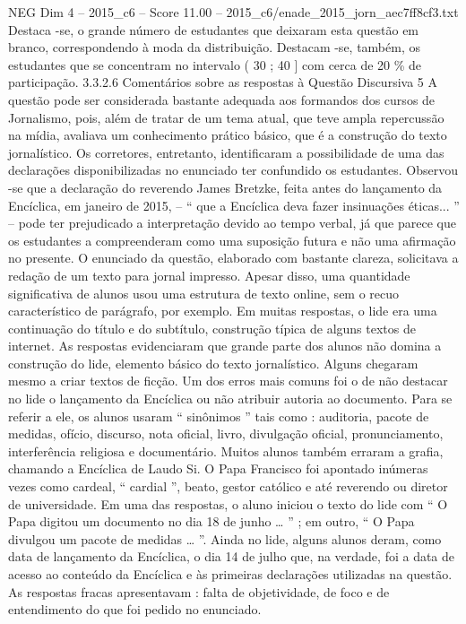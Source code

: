 \begin{textsample}{NEG Dim 4 – 2015\_c6 – Score 11.00 – 2015\_c6/enade\_2015\_jorn\_aec7ff8cf3.txt}
Destaca -se, o grande número de estudantes que deixaram esta questão em branco, correspondendo à moda da distribuição.
Destacam -se, também, os estudantes que se concentram no intervalo ( 30 ; 40 ] com cerca de 20 \% de participação. 3.3.2.6 Comentários sobre as respostas à Questão Discursiva 5 A questão pode ser considerada bastante adequada aos formandos dos cursos de Jornalismo, pois, além de tratar de um tema atual, que teve ampla repercussão na mídia, avaliava um conhecimento prático básico, que é a construção do texto jornalístico.
Os corretores, entretanto, identificaram a possibilidade de uma das declarações disponibilizadas no enunciado ter confundido os estudantes.
Observou -se que a declaração do reverendo James Bretzke, feita antes do lançamento da Encíclica, em janeiro de 2015, – “ que a Encíclica deva fazer insinuações éticas... ” – pode ter prejudicado a interpretação devido ao tempo verbal, já que parece que os estudantes a compreenderam como uma suposição futura e não uma afirmação no presente.
O enunciado da questão, elaborado com bastante clareza, solicitava a redação de um texto para jornal impresso.
Apesar disso, uma quantidade significativa de alunos usou uma estrutura de texto online, sem o recuo característico de parágrafo, por exemplo.
Em muitas respostas, o lide era uma continuação do título e do subtítulo, construção típica de alguns textos de internet.
As respostas evidenciaram que grande parte dos alunos não domina a construção do lide, elemento básico do texto jornalístico.
Alguns chegaram mesmo a criar textos de ficção.
Um dos erros mais comuns foi o de não destacar no lide o lançamento da Encíclica ou não atribuir autoria ao documento.
Para se referir a ele, os alunos usaram “ sinônimos ” tais como : auditoria, pacote de medidas, ofício, discurso, nota oficial, livro, divulgação oficial, pronunciamento, interferência religiosa e documentário.
Muitos alunos também erraram a grafia, chamando a Encíclica de Laudo Si.
O Papa Francisco foi apontado inúmeras vezes como cardeal, “ cardial ”, beato, gestor católico e até reverendo ou diretor de universidade.
Em uma das respostas, o aluno iniciou o texto do lide com “ O Papa digitou um documento no dia 18 de junho … ” ; em outro, “ O Papa divulgou um pacote de medidas … ”.
Ainda no lide, alguns alunos deram, como data de lançamento da Encíclica, o dia 14 de julho que, na verdade, foi a data de acesso ao conteúdo da Encíclica e às primeiras declarações utilizadas na questão.
As respostas fracas apresentavam : falta de objetividade, de foco e de entendimento do que foi pedido no enunciado.

\end{textsample}
